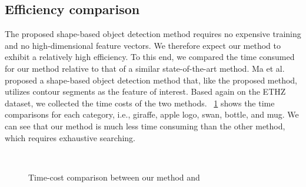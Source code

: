 \documentclass[journal]{IEEEtran}
\begin{document}
\subsection{Efficiency comparison}

The proposed shape-based object detection method requires no expensive training and no high-dimensional feature vectors. We therefore expect our method to exhibit a relatively high efficiency. 
To this end, we compared the time consumed for our method relative to that of a similar state-of-the-art method. 
Ma et al. \cite{ma2011} proposed a shape-based object detection method that, 
like the proposed method, utilizes contour segments as the feature of interest. 
Based again on the ETHZ dataset, we collected the time costs of the two methods.
\figurename~\ref{fig:22} shows the time comparisons for each category, 
i.e., giraffe, apple logo, swan, bottle, and mug. 
We can see that our method is much less time consuming than the other method, 
which requires exhaustive searching.

\begin{figure}[!t]
\centering
{}\hfil%
\hfil%
\\%
\hfil%
%
\caption{Time-cost comparison between our method and \cite{ma2011}}
\label{fig:22}
\end{figure}
\end{document}
